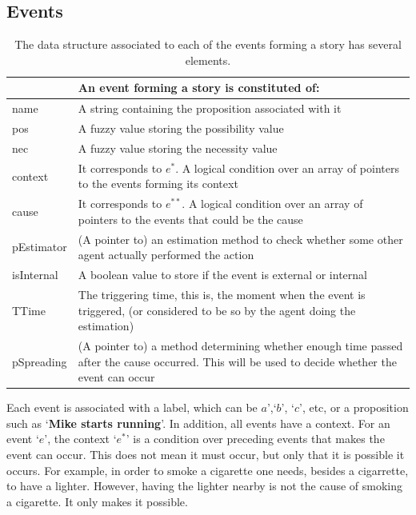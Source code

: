 \documentclass[
		twoside,openright,titlepage,numbers=noenddot,manychapters,
		headinclude,%
                footinclude=false,cleardoublepage=empty,
                BCOR=5mm,
		fontsize=11pt, %
                 enabledeprecatedfontcommands]{scrreprt}
\begin{document}
\subsection{Events}
\label{event_def}
\begin{table}[]
\caption{The data structure associated to each of the events forming a story has several elements.} 

\begin{tabular*}{1.00\textwidth}{ p{}  p{} }
\\
\hline\hline

 & \textbf{An event forming a story is constituted of:} \\
 [1ex]
  \hline
name & A string containing the proposition associated with it \\
pos & A fuzzy value storing the possibility value \\
nec & A fuzzy value storing the necessity value \\
[1ex] 
\hline
context & It corresponds to $e^*$.  A logical condition over an array of pointers to the events forming its context\\
cause & It corresponds to $e^{**}$. A logical condition over an array of pointers to the events that could be the cause \\ 
pEstimator & (A pointer to) an estimation method to check whether some other agent actually performed the action\\
isInternal & A boolean value to store if the event is external or internal\\
[1ex] 
\hline
TTime & The triggering time, this is, the moment when the event is triggered, (or considered to be so by the agent doing the estimation) \\
pSpreading & (A pointer to) a method determining whether enough time passed after the cause occurred. This will be used to decide whether the event can occur\\
[1ex] 
\hline
\end{tabular*}

\label{table_event_ch:trama}
\end{table}



Each event is associated with a label, which can be $a$’,`$b$’, `$c$’, etc, or a proposition such as ‘\textbf{Mike starts running}’. In addition, all events have a context. For an event ‘$e$’, the context ‘$e^*$’ is a condition over preceding events that makes the event can occur. This does not mean it must occur, but only that it is possible it occurs. For example, in order to smoke a cigarette one needs, besides a cigarrette, to have a lighter. However, having the lighter nearby is not the cause of smoking a cigarette. It only makes it possible. 
\end{document}
